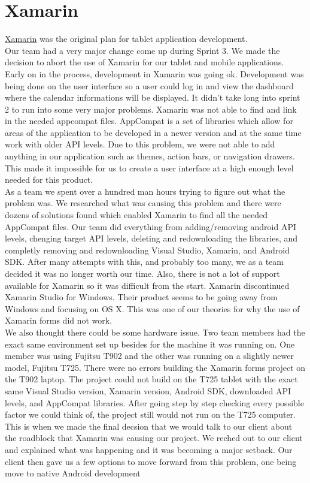 \documentclass{book}
\begin{document}
\chapter{Xamarin}
\label{XamarinAppendix}
\href{https://www.xamarin.com/}{Xamarin} was the original plan for tablet application development. \\

Our team had a very major change come up during Sprint 3.  We made the decision to abort the use of Xamarin for our tablet and mobile applications.  Early on in the process, development in Xamarin was going ok.  Development was being done on the user interface so a user could log in and view the dashboard where the calendar informations will be displayed.  It didn't take long into sprint 2 to run into some very major problems. Xamarin was not able to find and link in the needed appcompat files.  AppCompat is a set of libraries which allow for areas of the application to be developed in a newer version and at the same time work with older API levels. Due to this problem, we were not able to add anything in our application such as themes, action bars, or navigation drawers.  This made it impossible for us to create a user interface at a high enough level needed for this product.\\  

\noindent As a team we spent over a hundred man hours trying to figure out what the problem was.  We researched what was causing this problem and there were dozens of solutions found which enabled Xamarin to find all the needed AppCompat files. Our team did everything from adding/removing android API levels, chenging target API levels, deleting and redownloading the libraries, and completly removing and redownloading Visual Studio, Xamarin, and Android SDK.  After many attempts with this, and probably too many, we as a team decided it was no longer worth our time.  Also, there is not a lot of support available for Xamarin so it was difficult from the start.  Xamarin discontinued Xamarin Studio for Windows.  Their product seems to be going away from Windows and focusing on OS X. This was one of our theories for why the use of Xamarin forms did not work. \\ 

\noindent We also thought there could be some hardware issue.  Two team members had the exact same environment set up besides for the machine it was running on.  One member was using Fujitsu T902 and the other was running on a slightly newer model, Fujitsu T725. There were no errors building the Xamarin forms project on the T902 laptop.  The project could not build on the T725 tablet with the exact same Visual Studio version, Xamarin version, Android SDK, downloaded API levels, and AppCompat libraries.  After going step by step checking every possible factor we could think of, the project still would not run on the T725 computer.  This is when we made the final decsion that we would talk to our client about the roadblock that Xamarin was causing our project.  We reched out to our client and explained what was happening and it was becoming a major setback. Our client then gave us a few options to move forward from this problem, one being move to native Android development\\
\end{document}

